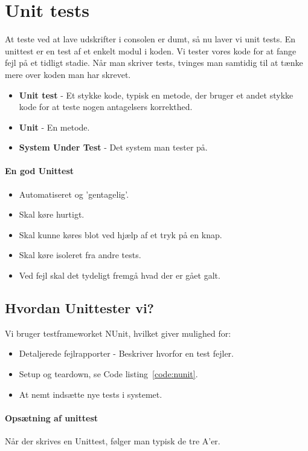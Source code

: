 \section{Unit tests}
At teste ved at lave udskrifter i consolen er dumt, så nu laver vi unit tests. En unittest er en test af et enkelt modul i koden. Vi tester vores kode for at fange fejl på et tidligt stadie. Når man skriver tests, tvinges man samtidig til at tænke mere over koden man har skrevet.

\begin{itemize}
	\item \textbf{Unit test} - Et stykke kode, typisk en metode, der bruger et andet stykke kode for at teste nogen antagelsers korrekthed.
	\item \textbf{Unit} - En metode.
	\item \textbf{System Under Test} - Det system man tester på.
\end{itemize}

\paragraph{En god Unittest}
\begin{itemize}
	\item Automatiseret og 'gentagelig'.
	\item Skal køre hurtigt.
	\item Skal kunne køres blot ved hjælp af et tryk på en knap.
	\item Skal køre isoleret fra andre tests.
	\item Ved fejl skal det tydeligt fremgå hvad der er gået galt.
\end{itemize}

\subsection{Hvordan Unittester vi?}
Vi bruger testframeworket NUnit, hvilket giver mulighed for:

\begin{itemize}
	\item Detaljerede fejlrapporter - Beskriver hvorfor en test fejler.
	\item Setup og teardown, se Code listing~\ref{code:nunit}.
	\item At nemt indsætte nye tests i systemet.
\end{itemize}

\paragraph{Opsætning af unittest} Når der skrives en Unittest, følger man typisk de tre A'er.

